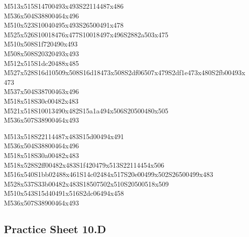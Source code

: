 \documentclass{article}
\begin{document}
\begin{multicols}{5}
\begin{center}
M513x515S14700493x493S22114487x486 %
\\M536x504S38800464x496 %
\\M510x523S10040495x493S26500491x478 %
\\M525x526S10018476x477S10018497x496S2882a503x475 %
\\M510x508S1f720490x493 %
\\M508x508S20320493x493 %
\\M512x515S1dc20488x485 %
\\M527x528S16d10509x508S16d18473x508S2df06507x479S2df1e473x480S2fb00493x473 %
\\M537x504S38700463x496 %
\\M518x518S30c00482x483 %
\\M521x518S10013490x482S15a1a494x506S20500480x505 %
\\M536x507S38900464x493 %
\vfil
\columnbreak

M513x518S22114487x483S15d00494x491 %
\\M536x504S38800464x496 %
\\M518x518S30a00482x483 %
\\M518x528S2ff00482x483S1f420479x513S22114454x506 %
\\M516x540S1bb02488x461S14c02484x517S20e00499x502S26500499x483 %
\\M528x537S33b00482x483S18507502x510S20500518x509 %
\\M510x543S15d40491x516S2dc06494x458 %
\\M536x507S38900464x493 %
\vfil

\end{center}
\end{multicols}

\subsection{Practice Sheet 10.D}
\end{document}
